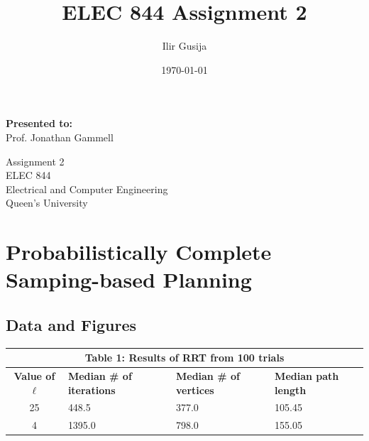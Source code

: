 \documentclass{article}
\title{ELEC 844 Assignment 2}
\author{Ilir Gusija}
\date{\today}
\begin{document}
\begin{titlepage}
\maketitle
\begin{center}
    \textbf{Presented to:}\\
    Prof. Jonathan Gammell\\
    \vspace{5mm}

    Assignment 2\\
    ELEC 844\\
    Electrical and Computer Engineering\\
    Queen's University\\
    \vspace{5mm}
    
\end{center}
\end{titlepage}

\section{Probabilistically Complete Samping-based Planning}
\subsection{Data and Figures}\label{sub:Data and Figures} %
\begin{table}[h!]
    \centering
    \begin{tabularx}{\textwidth}{|c|X|X|X|}
        \hline
        \multicolumn{4}{|c|}{\textbf{Table 1: Results of RRT from 100 trials}} \\ \hline
        \textbf{Value of} $\ell$ & 
        \textbf{Median \# of iterations} & 
        \textbf{Median \# of vertices} & 
        \textbf{Median path length} \\ \hline
        25 & 448.5 & 377.0 & 105.45 \\ \hline
        4  & 1395.0 & 798.0 & 155.05 \\ \hline
    \end{tabularx}
\end{table}
\end{document}
